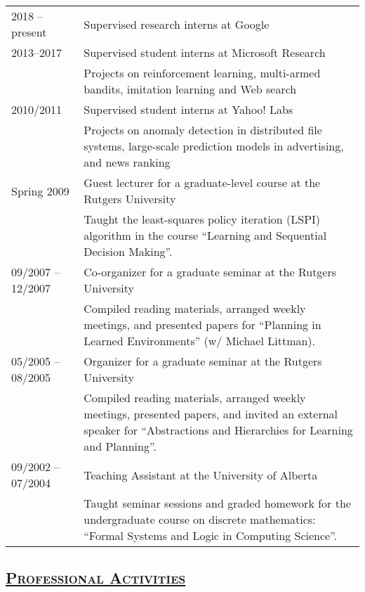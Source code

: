 \documentclass[10pt,twoside,letterpaper]{article}
\newcommand{\tabrowsep}{\vspace{1mm}}
\begin{document}
\begin{tabular}{p{30mm} p{120mm}}
2018 -- present & Supervised research interns at Google \\
2013--2017 & Supervised student interns at Microsoft Research \\
                   & {\small\textmd{Projects on reinforcement learning, multi-armed bandits, imitation learning and Web search}} \\
2010/2011      & Supervised student interns at Yahoo! Labs \\
                   & {\small\textmd{Projects on anomaly detection in distributed file systems, large-scale prediction models in advertising, and news ranking}} \\
Spring 2009 & Guest lecturer for a graduate-level course at the Rutgers University \\
                   & {\small\textmd{Taught the least-squares policy iteration (LSPI) algorithm in the course ``Learning and Sequential Decision Making''.}} \\
09/2007 -- 12/2007 & Co-organizer for a graduate seminar at the Rutgers University \\
                   & {\small\textmd{Compiled reading materials, arranged weekly meetings, and presented papers for ``Planning in Learned Environments'' (w/ Michael Littman).}}\tabrowsep \\
05/2005 -- 08/2005 & Organizer for a graduate seminar at the Rutgers University \\
                   & {\small\textmd{Compiled reading materials, arranged weekly meetings, presented papers, and invited an external speaker for ``Abstractions and Hierarchies for Learning and Planning''.}}\tabrowsep \\
09/2002 -- 07/2004 & Teaching Assistant at the University of Alberta \\
                   & {\small\textmd{Taught seminar sessions and graded homework for the undergraduate course on discrete mathematics: ``Formal Systems and Logic in Computing Science''.}} %
\end{tabular}

\subsection*{\textsc{\underline{Professional Activities}}}
\end{document}
